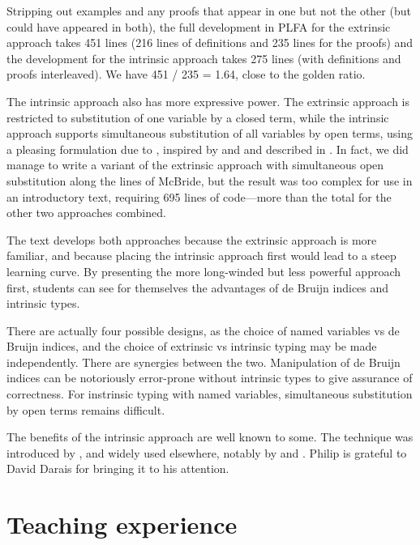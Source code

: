 \documentclass[preprint,authoryear]{elsarticle}
\begin{document}
Stripping out examples and any proofs that appear in one but not the other (but
could have appeared in both), the full development in PLFA for the extrinsic approach
takes 451 lines (216 lines of definitions and 235 lines for the proofs) and the
development for the intrinsic approach takes 275 lines (with definitions and
proofs interleaved).  We have 451 / 235 = 1.64, close to the golden ratio.

The intrinsic approach also has more expressive power.  The extrinsic
approach is restricted to substitution of one variable by a closed
term, while the intrinsic approach supports simultaneous substitution
of all variables by open terms, using a pleasing formulation due to
\citet{McBride-2005}, inspired by \citet{Goguen-and-McKinna-1997} and
\citet{Altenkirch-and-Reus-1999} and described in
\citet{Allais-et-al-2017}. In fact, we did manage to write a variant of
the extrinsic approach with simultaneous open substitution along the lines
of McBride, but the result was too complex for use in an introductory
text, requiring 695 lines of code---more than the total for the other
two approaches combined.

The text develops both approaches because the extrinsic approach is more
familiar, and because placing the intrinsic approach first would
lead to a steep learning curve.  By presenting the more long-winded
but less powerful approach first, students can see for themselves the
advantages of de Bruijn indices and intrinsic types.

There are actually four possible designs, as the choice of named
variables vs de Bruijn indices, and the choice of extrinsic vs
intrinsic typing may be made independently.  There are synergies
between the two.  Manipulation of de Bruijn indices can be notoriously
error-prone without intrinsic types to give assurance of correctness.
For instrinsic typing with named variables, simultaneous substitution by
open terms remains difficult.

The benefits of the intrinsic approach 
are well known to some. The technique was introduced by
\citet{Altenkirch-and-Reus-1999}, and widely used elsewhere,
notably by \citet{Chapman-2009} and \citet{Allais-et-al-2017}.
Philip is grateful to David Darais for bringing it to his attention.


\section{Teaching experience}
\end{document}
